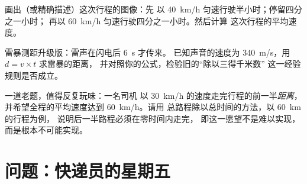 \begin{exercise}[$\star\star$]\label{exo:g7:motion-average-speed:10}
画出（或精确描述）这次行程的图像：先
以 \qty{40}{km/h} 匀速行驶半小时；停留四分之一小时；
再以 \qty{60}{km/h} 匀速行驶四分之一小时。然后计算
这次行程的平均速度。
\end{exercise}

\begin{exercise}[$\star\star$]\label{exo:g7:motion-average-speed:11}
雷暴测距升级版：雷声在闪电后 \qty{6}{s} 才传来。
已知声音的速度为 \qty{340}{m/s}，用 $d = v \times t$ 求雷暴的距离，
并对照你的公式，检验旧的“除以三得千米数”
这一经验规则是否成立。
\end{exercise}

\begin{exercise}[$\star\star\star$]\label{exo:g7:motion-average-speed:12}
一道老题，值得反复玩味：一名司机
以 \qty{30}{km/h} 的速度走完行程的前一半\emph{距离}，
并希望全程的平均速度达到 \qty{60}{km/h}。请用
总路程除以总时间的方法，以 \qty{60}{km} 的行程为例，
说明后一半路程必须在零时间内走完，
即这一愿望不是难以实现，而是根本不可能实现。
\end{exercise}

\section{问题：快递员的星期五}

